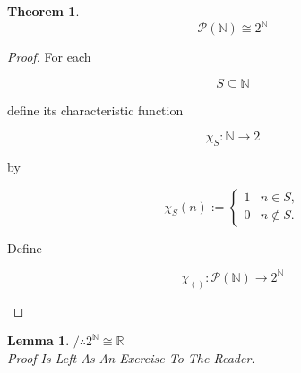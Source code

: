 \documentclass[10pt,a4paper]{book}
\newtheorem{theorem}{Theorem}[section]
\newtheorem{lemma}{Lemma}[section]
\begin{document}
\begin{theorem}

    \[
        \mathcal P(\mathbb N) \cong 2^{\mathbb N}
    \]

\end{theorem}

\begin{proof}

    For each

    \[
        S\subseteq\mathbb N
    \]

    define its characteristic function

    \[
        \chi_S:\mathbb N\to 2
    \]

    by

    \[
        \chi_S(n):=
        \begin{cases}
            1 & n\in S,    \\
            0 & n\notin S.
        \end{cases}
    \]

    Define

    \[
        \chi_{()} :\mathcal P(\mathbb N)\to 2^{\mathbb N}
    \]

    \begin{fitchproof}[arrayenv=tabular]

        \open
        \close


        \open



        \close



    \end{fitchproof}

\end{proof}

\begin{lemma} $/ \therefore  2^\mathbb{N} \cong \mathbb{R}$ \\
    Proof Is Left As An Exercise To The Reader.
\end{lemma}
\end{document}
